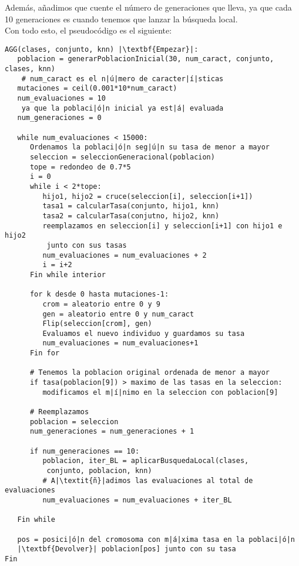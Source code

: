 \documentclass[12pt]{article}
\begin{document}
Además, añadimos que cuente el número de generaciones que lleva, ya que cada 10 generaciones es cuando tenemos que lanzar la búsqueda local.\\

Con todo esto, el pseudocódigo es el siguiente:
\begin{lstlisting}
AGG(clases, conjunto, knn) |\textbf{Empezar}|:
   poblacion = generarPoblacionInicial(30, num_caract, conjunto, clases, knn)
    # num_caract es el n|ú|mero de caracter|í|sticas
   mutaciones = ceil(0.001*10*num_caract)
   num_evaluaciones = 10
    ya que la poblaci|ó|n inicial ya est|á| evaluada
   num_generaciones = 0
   
   while num_evaluaciones < 15000:
      Ordenamos la poblaci|ó|n seg|ú|n su tasa de menor a mayor
      seleccion = seleccionGeneracional(poblacion)
      tope = redondeo de 0.7*5
      i = 0
      while i < 2*tope:
         hijo1, hijo2 = cruce(seleccion[i], seleccion[i+1])
         tasa1 = calcularTasa(conjunto, hijo1, knn)
         tasa2 = calcularTasa(conjutno, hijo2, knn)
         reemplazamos en seleccion[i] y seleccion[i+1] con hijo1 e hijo2
          junto con sus tasas
         num_evaluaciones = num_evaluaciones + 2
         i = i+2
      Fin while interior
      
      for k desde 0 hasta mutaciones-1:
         crom = aleatorio entre 0 y 9
         gen = aleatorio entre 0 y num_caract
         Flip(seleccion[crom], gen)
         Evaluamos el nuevo individuo y guardamos su tasa
         num_evaluaciones = num_evaluaciones+1
      Fin for
      
      # Tenemos la poblacion original ordenada de menor a mayor
      if tasa(poblacion[9]) > maximo de las tasas en la seleccion:
         modificamos el m|í|nimo en la seleccion con poblacion[9]
      
      # Reemplazamos
      poblacion = seleccion
      num_generaciones = num_generaciones + 1
      
      if num_generaciones == 10:  
         poblacion, iter_BL = aplicarBusquedaLocal(clases,
          conjunto, poblacion, knn)    
         # A|\textit{ñ}|adimos las evaluaciones al total de evaluaciones
         num_evaluaciones = num_evaluaciones + iter_BL
      
   Fin while
   
   pos = posici|ó|n del cromosoma con m|á|xima tasa en la poblaci|ó|n
   |\textbf{Devolver}| poblacion[pos] junto con su tasa
Fin

\end{lstlisting}
\end{document}
